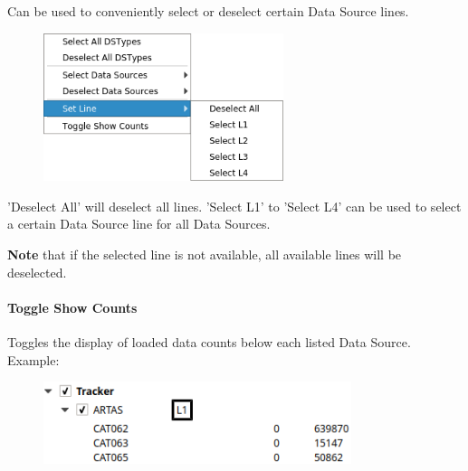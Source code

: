 Can be used to conveniently select or deselect certain Data Source lines.

\begin{figure}[H]
    \center
    \includegraphics[width=7cm,frame]{figures/ui_data_source_configmenu_lines.png}
\end{figure}

'Deselect All' will deselect all lines. 'Select L1' to 'Select L4' can be used to select a certain Data Source line for all Data Sources.

\textbf{Note} that if the selected line is not available, all available lines will be deselected.

\paragraph{Toggle Show Counts}

Toggles the display of loaded data counts below each listed Data Source. Example:

\begin{figure}[H]
    \center
    \includegraphics[width=9cm,frame]{figures/ui_data_source_configmenu_counts.png}
\end{figure}
